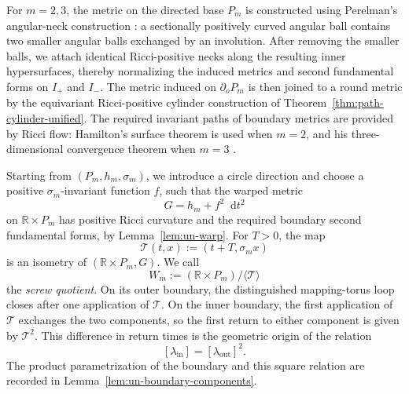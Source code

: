 \documentclass[11pt,reqno]{amsart}
\theoremstyle{definition}
\numberwithin{equation}{section}
\newcommand{\dd}{\mathop{}\!\mathrm d}
\begin{document}
For $m=2,3$, the metric on the directed base $P_m$ is constructed using Perelman's
angular-neck construction \cite{Perelman1997}: a sectionally positively
curved angular ball contains two smaller angular balls exchanged by an
involution.  After removing the smaller balls, we attach identical
Ricci-positive necks along the resulting inner hypersurfaces, thereby
normalizing the induced metrics and second fundamental forms on
$I_+$ and $I_-$.  The metric induced on $\partial_oP_m$ is
then joined to a round metric by the equivariant Ricci-positive cylinder
construction of Theorem~\ref{thm:path-cylinder-unified}.  The required
invariant paths of boundary metrics are
provided by Ricci flow: Hamilton's surface theorem is used when $m=2$,
and his three-dimensional convergence theorem when $m=3$
\cite{Hamilton1982, Hamilton1988Surfaces}.

Starting from $(P_m,h_m,\sigma_m)$, we introduce a circle direction and
choose a positive $\sigma_m$-invariant function $f$, such that the warped
metric
\[
 G=h_m+f^2\dd t^2
\]
on $\mathbb R\times P_m$ has positive Ricci curvature and the required
boundary second fundamental forms, by Lemma~\ref{lem:un-warp}.  For
$T>0$, the map
\[
 \mathcal T(t,x):=(t+T,\sigma_m x)
\]
is an isometry of $(\mathbb R\times P_m,G)$.  We call
\begin{equation}\label{def:screw-quotient}
 W_m:=(\mathbb R\times P_m)/\langle\mathcal T\rangle
\end{equation}
the \emph{screw quotient}.  On its outer boundary, the distinguished
mapping-torus loop closes after one application of $\mathcal T$.  On the
inner boundary, the first application of $\mathcal T$ exchanges the two
components, so the first return to either component is given by
$\mathcal T^2$.  This difference in
return times is the geometric origin of the relation
\[
 [\lambda_{\mathrm{in}}]
 =
 [\lambda_{\mathrm{out}}]^2.
\]
The product parametrization of the boundary and this square relation are recorded
in Lemma~\ref{lem:un-boundary-components}.
\end{document}
